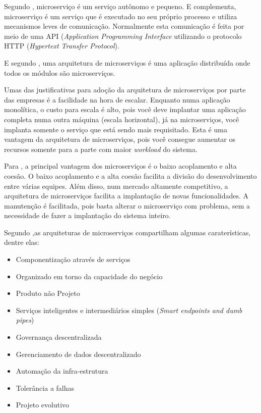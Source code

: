 \documentclass[12pt]{article}
\theoremstyle{plain}
\begin{document}
Segundo \cite{Newman:15}, microserviço é um serviço autônomo e pequeno. E \cite{martinfowler-microservices:2014} complementa, microserviço é um serviço que é executado no seu próprio processo e utiliza mecanismos leves de comunicação. Normalmente esta comunicação é feita por meio de uma API (\textit{Application Programming Interface} utilizando o protocolo HTTP (\textit{Hypertext Transfer Protocol}).

E segundo \cite{Dragoni2017, martinfowler-microservices:2014}, uma arquitetura de microserviços é uma aplicação distribuída onde todos os módulos são microserviços.

Umas das justificativas para adoção da arquitetura de microserviços por parte das empresas é a facilidade na hora de escalar. Enquanto numa aplicação monolítica, o custo para escala é alto, pois você deve implantar uma aplicação completa numa outra máquina (escala horizontal), já na microserviços, você implanta somente o serviço que está sendo mais requisitado. Esta é uma vantagem da arquitetura de microserviços, pois você consegue aumentar os recursos somente para a parte com maior \textit{workload} do sistema. 

Para \cite{wolf:2018}, a principal vantagem dos microserviços é o baixo acoplamento e alta coesão. O baixo acoplamento e a alta coesão facilita a divisão do desenvolvimento entre várias equipes. Além disso, num mercado altamente competitivo, a arquitetura de microserviços facilita a implantação de novas funcionalidades. A manutenção é facilitada, pois basta alterar o microserviço com problema, sem a necessidade de fazer a implantação do sistema inteiro.

Segundo \cite{martinfowler-microservices:2014},as arquiteturas de microserviços compartilham algumas caraterísticas, dentre elas:

\begin{itemize}
    \item Componentização através de serviços
    \item Organizado em torno da capacidade do negócio
    \item Produto não Projeto
    \item Serviços inteligentes e intermediários simples (\textit{Smart endpoints and dumb pipes})
    \item Governança descentralizada
    \item Gerenciamento de dados descentralizado
    \item Automação da infra-estrutura
    \item Tolerância a falhas
    \item Projeto evolutivo
\end{itemize}
\end{document}
